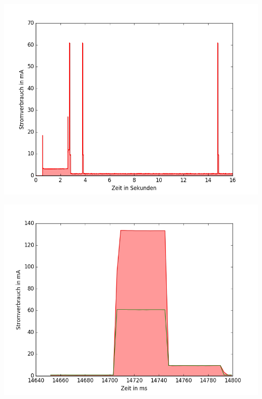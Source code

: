 \documentclass[18pt]{beamer}
\begin{document}
\begin{frame}
	\begin{minipage}[c][\textheight][c]{\textwidth}
		\centering
		\includegraphics[height=0.95\textheight]{plots/lora5.png}
	\end{minipage}
\end{frame}

\begin{frame}
	\begin{minipage}[c][\textheight][c]{\textwidth}
		\centering
		\includegraphics[height=0.95\textheight]{plots/lora235send.png}
	\end{minipage}
\end{frame}
\end{document}
